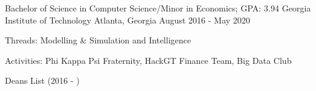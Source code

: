 \documentclass[
    changecolor={0, 38, 58},
]{pranav-resume}
\begin{document}
\pagestyle{empty} %


\cventry
  {Bachelor of Science in Computer Science/Minor in Economics; GPA: 3.94}
  {Georgia Institute of Technology}
  {Atlanta, Georgia}
  {August 2016 - May 2020}
  {
    \begin{cvitems}
      \item {Threads: Modelling \& Simulation and Intelligence}
      \item {Activities: Phi Kappa Psi Fraternity, HackGT Finance Team, Big Data Club}
      \item {Deans List (2016 - )}
    \end{cvitems}
  }
\end{document}
